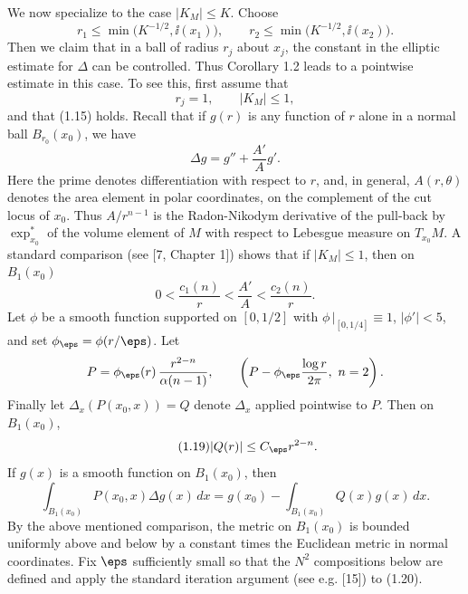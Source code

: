 We now specialize to the case $\lvert K_M\rvert \le K$. Choose
\begin{equation}\tag{1.15}
 r_1\le \min\bigl(K^{-1/2},\ii(x_1)\bigr),\qquad
 r_2\le \min\bigl(K^{-1/2},\ii(x_2)\bigr).
\end{equation}
Then we claim that in a ball of radius $r_j$ about $x_j$, the constant in the
elliptic estimate for $\Delta$ can be controlled. Thus Corollary 1.2 leads to a
pointwise estimate in this case. To see this, first assume that
\begin{equation}\tag{1.16}
 r_j=1,\qquad \lvert K_M\rvert \leq 1,
\end{equation}
and that (1.15) holds. Recall that if $g(r)$ is any function of $r$ alone in a
normal ball $B_{r_0}(x_0)$, we have
\begin{equation}\tag{1.17}
 \Delta g = g'' + \frac{A'}{A}g'.
\end{equation}
Here the prime denotes differentiation with respect to $r$, and, in general,
$A(r,\theta)$ denotes the area element in polar coordinates, on the complement
of the cut locus of $x_0$. Thus $A/r^{n-1}$ is the Radon-Nikodym derivative of
the pull-back by $\exp^*_{x_0}$ of the volume element of $M$ with respect to
Lebesgue measure on $T_{x_0}M$. A standard comparison (see [7, Chapter 1])
shows that if $\lvert K_M\rvert \leq 1$, then on $B_1(x_0)$
\begin{equation}\tag{1.18}
 0<\frac{c_1(n)}{r}<\frac{A'}{A}<\frac{c_2(n)}{r}.
\end{equation}
Let $\phi$ be a smooth function supported on $[0,1/2]$ with
$\phi\,|_{[0,1/4]}\equiv 1$, $|\phi'|<5$, and set $\phi_{\eps}=\phi(r/\eps)$.
Let
\[
 P=\phi_{\eps}(r)\,\frac{r^{2-n}}{\alpha(n-1)},\qquad
\left(P-\phi_{\eps}\frac{\log r}{2\pi},\ n=2\right).
\]
Finally let $\Delta_x(P(x_0,x))=Q$ denote $\Delta_x$ applied pointwise to $P$.
Then on $B_1(x_0)$,
\begin{equation}\tag{1.19}
 |Q(r)|\le C_{\eps}r^{2-n}.
\end{equation}
If $g(x)$ is a smooth function on $B_1(x_0)$, then
\begin{equation}\tag{1.20}
 \int_{B_1(x_0)} P(x_0,x)\Delta g(x)\,dx = g(x_0)-\int_{B_1(x_0)} Q(x)g(x)\,dx.
\end{equation}
By the above mentioned comparison, the metric on $B_1(x_0)$ is bounded
uniformly above and below by a constant times the Euclidean metric in normal
coordinates. Fix $\eps$ sufficiently small so that the $N^2$ compositions below
are defined and apply the standard iteration argument (see e.g. [15]) to (1.20).
